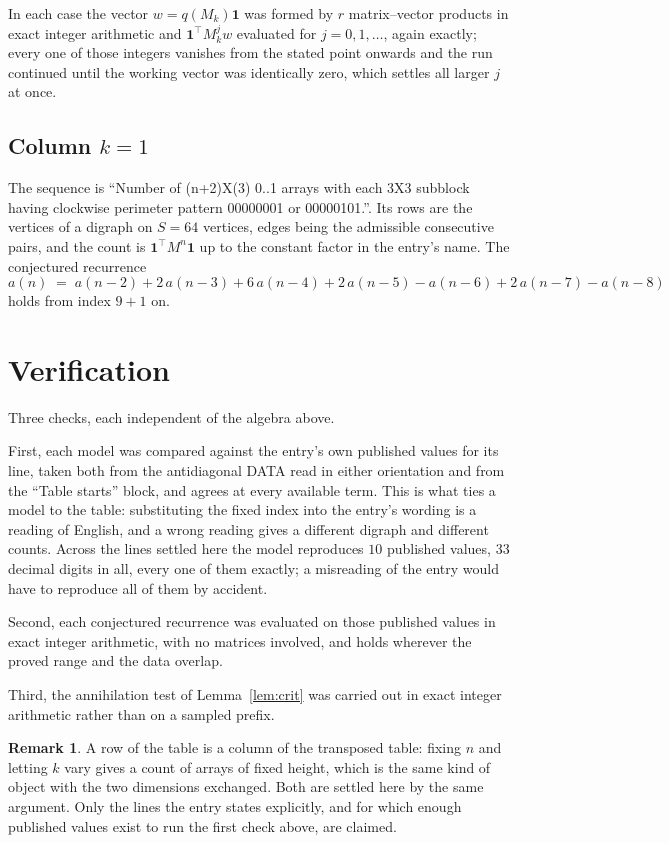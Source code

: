 \documentclass[11pt,a4paper]{article}
\theoremstyle{plain}
\theoremstyle{definition}
\newtheorem{remark}[theorem]{Remark}
\begin{document}
In each case the vector $w=q(M_k)\mathbf{1}$ was formed by $r$ matrix--vector products in
exact integer arithmetic and $\mathbf{1}^{\!\top}M_k^{j}w$ evaluated for $j=0,1,\dots$,
again exactly; every one of those integers vanishes from the stated point onwards and the run
continued until the working vector was identically zero, which settles all larger $j$ at once.

\subsection*{Column $k$$=1$}
The sequence is ``Number of (n+2)X(3) 0..1 arrays with each 3X3 subblock having clockwise perimeter pattern 00000001 or 00000101.''. Its rows are the vertices of a digraph on
$S=64$ vertices, edges being the admissible consecutive pairs, and the count is
$\mathbf{1}^{\!\top}M^{n}\mathbf{1}$ up to the constant factor in the entry's name.
The conjectured recurrence
\[
a(n)\;=\;a(n-2) + 2\,a(n-3) + 6\,a(n-4) + 2\,a(n-5) - a(n-6) + 2\,a(n-7) - a(n-8)
\]
holds from index $9+1$ on.

\section{Verification}

Three checks, each independent of the algebra above.

First, each model was compared against the entry's own published values for its line, taken
both from the antidiagonal DATA read in either orientation and from the ``Table starts''
block, and agrees at every available term. This is what ties a model to the table:
substituting the fixed index into the entry's wording is a reading of English, and a wrong
reading gives a different digraph and different counts. Across the lines settled here the
model reproduces $10$ published values, $33$ decimal digits in all, every one of
them exactly; a misreading of the entry would have to reproduce all of them by accident.

Second, each conjectured recurrence was evaluated on those published values in exact
integer arithmetic, with no matrices involved, and holds wherever the proved range and the
data overlap.

Third, the annihilation test of Lemma~\ref{lem:crit} was carried out in exact integer
arithmetic rather than on a sampled prefix.

\begin{remark}
A row of the table is a column of the transposed table: fixing $n$ and letting $k$ vary gives a
count of arrays of fixed height, which is the same kind of object with the two dimensions
exchanged. Both are settled here by the same argument. Only the lines the entry states
explicitly, and for which enough published values exist to run the first check above, are
claimed.
\end{remark}
\end{document}

